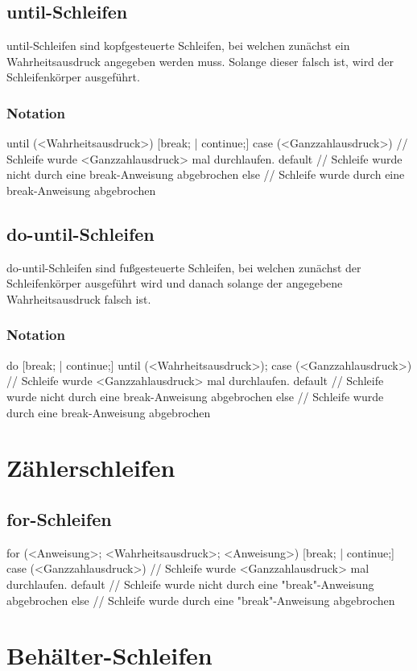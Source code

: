 \subsection{until-Schleifen}
until-Schleifen sind kopfgesteuerte Schleifen, bei welchen zunächst ein Wahrheitsausdruck angegeben werden muss.
Solange dieser falsch ist, wird der Schleifenkörper ausgeführt.

\subsubsection{Notation}
until (<Wahrheitsausdruck>)
{
	[break; | continue;]
}
case (<Ganzzahlausdruck>) // Schleife wurde <Ganzzahlausdruck> mal durchlaufen.
{
}
default // Schleife wurde nicht durch eine break-Anweisung abgebrochen
{
}
else // Schleife wurde durch eine break-Anweisung abgebrochen
{
}

\subsection{do-until-Schleifen}
do-until-Schleifen sind fußgesteuerte Schleifen, bei welchen zunächst der Schleifenkörper ausgeführt wird und danach
solange der angegebene Wahrheitsausdruck falsch ist.

\subsubsection{Notation}
do
{
	[break; | continue;]
}
until (<Wahrheitsausdruck>);
case (<Ganzzahlausdruck>) // Schleife wurde <Ganzzahlausdruck> mal durchlaufen.
{
}
default // Schleife wurde nicht durch eine break-Anweisung abgebrochen
{
}
else // Schleife wurde durch eine break-Anweisung abgebrochen
{
}

\section{Zählerschleifen}

\subsection{for-Schleifen}
for (<Anweisung>; <Wahrheitsausdruck>; <Anweisung>)
{
	[break; | continue;]
}
case (<Ganzzahlausdruck>) // Schleife wurde <Ganzzahlausdruck> mal durchlaufen.
{
}
default // Schleife wurde nicht durch eine "break"-Anweisung abgebrochen
{
}
else // Schleife wurde durch eine "break"-Anweisung abgebrochen
{
}

\section{Behälter-Schleifen}

